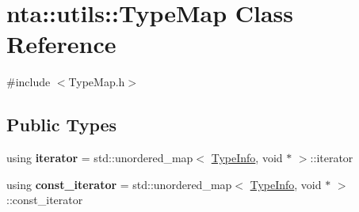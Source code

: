 \hypertarget{classnta_1_1utils_1_1TypeMap}{}\section{nta\+:\+:utils\+:\+:Type\+Map Class Reference}
\label{classnta_1_1utils_1_1TypeMap}


{\ttfamily \#include $<$Type\+Map.\+h$>$}

\subsection*{Public Types}
\begin{DoxyCompactItemize}
\item 
\mbox{\label{classnta_1_1utils_1_1TypeMap_ad525496cb8aea267ff762348ff7221f7}} 
using {\bfseries iterator} = std\+::unordered\+\_\+map$<$ \hyperlink{structnta_1_1utils_1_1TypeInfo}{Type\+Info}, void $\ast$ $>$\+::iterator
\item 
\mbox{\label{classnta_1_1utils_1_1TypeMap_a7a6c8ea4ef245b196f649a2ee45e1af4}} 
using {\bfseries const\+\_\+iterator} = std\+::unordered\+\_\+map$<$ \hyperlink{structnta_1_1utils_1_1TypeInfo}{Type\+Info}, void $\ast$ $>$\+::const\+\_\+iterator
\end{DoxyCompactItemize}
